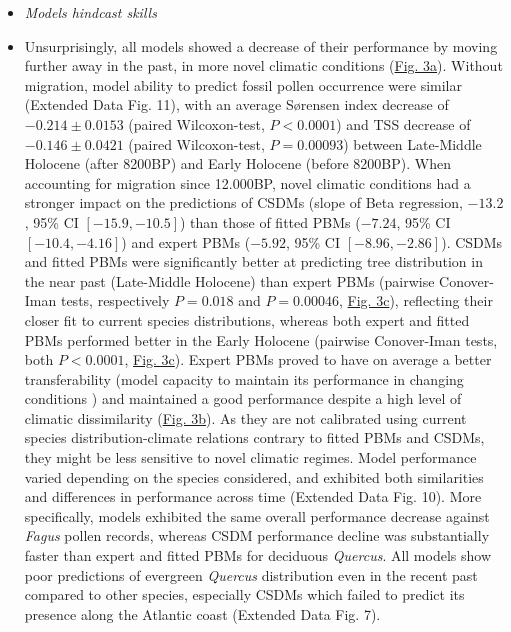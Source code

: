 \documentclass[pdflatex, sn-nature]{sn-jnl}%
\begin{document}
\renewcommand\labelitemi{{\boldmath$\cdot$}}
\begin{itemize}
\setlength\itemsep{1em}
\item \emph{Models hindcast skills}\par
\item Unsurprisingly, all models showed a decrease of their performance by moving further away in the past, in more novel climatic conditions (\hyperref[past_performance]{Fig. 3a}). Without migration, model ability to predict fossil pollen occurrence were similar (Extended Data Fig. 11), with an average Sørensen index decrease of $-0.214\pm0.0153$ (paired Wilcoxon-test, $P<0.0001$) and TSS decrease of $-0.146\pm0.0421$ (paired Wilcoxon-test, $P=0.00093$) between Late-Middle Holocene (after 8200BP) and Early Holocene (before 8200BP).  When accounting for migration since 12.000BP, novel climatic conditions had a stronger impact on the predictions of CSDMs (slope of Beta regression, $-13.2$, 95\% CI $[-15.9, -10.5]$) than those of fitted PBMs ($-7.24$, 95\% CI $[-10.4, -4.16]$) and expert PBMs ($-5.92$, 95\% CI $[-8.96, -2.86]$). CSDMs and fitted PBMs were significantly better at predicting tree distribution in the near past (Late-Middle Holocene) than expert PBMs (pairwise Conover-Iman tests, respectively $P=0.018$ and $P=0.00046$, \hyperref[past_performance]{Fig. 3c}), reflecting their closer fit to current species distributions, whereas both expert and fitted PBMs performed better in the Early Holocene (pairwise Conover-Iman tests, both $P<0.0001$, \hyperref[past_performance]{Fig. 3c}). Expert PBMs proved to have on average a better transferability (model capacity to maintain its performance in changing conditions \cite{UribeRivera2022}) and maintained a good performance despite a high level of climatic dissimilarity (\hyperref[past_performance]{Fig. 3b}). As they are not calibrated using current species distribution-climate relations contrary to fitted PBMs and CSDMs, they might be less sensitive to novel climatic regimes. Model performance varied depending on the species considered, and exhibited both similarities and differences in performance across time (Extended Data Fig. 10). More specifically, models exhibited the same overall performance decrease against \emph{Fagus} pollen records, whereas CSDM performance decline was substantially faster than expert and fitted PBMs for deciduous \emph{Quercus}. All models show poor predictions of evergreen \emph{Quercus} distribution even in the recent past compared to other species, especially CSDMs which failed to predict its presence along the Atlantic coast (Extended Data Fig. 7).


\end{itemize}
\end{document}
